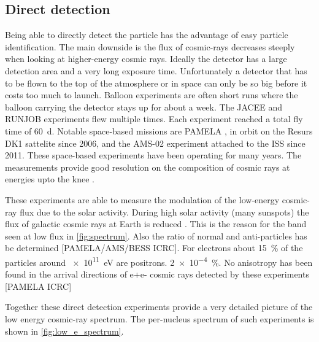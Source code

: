 \subsection{Direct detection}

Being able to directly detect the particle has the advantage of easy particle identification. The main downside is the flux of cosmic-rays decreases steeply when looking at higher-energy cosmic rays. Ideally the detector has a large detection area and a very long exposure time. Unfortunately a detector that has to be flown to the top of the atmosphere or in space can only be so big before it costs too much to launch. Balloon experiments are often short runs where the balloon carrying the detector stays up for about a week. The JACEE \cite{asakimori1998jacee} and RUNJOB \cite{hareyama2011runjob} experiments flew multiple times. Each experiment reached a total fly time of \SI{60}{\day}. Notable space-based missions are PAMELA \cite{adriani2014pamela}, in orbit on the Resurs DK1 sattelite since 2006, and the AMS-02 \cite{casaus2014ams} experiment attached to the ISS since 2011. These space-based experiments have been operating for many years. The measurements provide good resolution on the composition of cosmic rays at energies upto the knee \cite{kulikov1958knee}.

These experiments are able to measure the modulation of the low-energy cosmic-ray flux due to the solar activity. During high solar activity (many sunspots) the flux of galactic cosmic rays at Earth is reduced \cite{adriani2013modulation}. This is the reason for the band seen at low flux in \cref{fig:spectrum}. Also the ratio of normal and anti-particles has be determined [PAMELA/AMS/BESS ICRC]. For electrons about \SI{15}{\percent} of the particles around \SI{e11}{\eV} are positrons. \SI{2e-4}{\percent}. No anisotropy has been found in the arrival directions of e+e- cosmic rays detected by these experiments [PAMELA ICRC]

Together these direct detection experiments provide a very detailed picture of the low energy cosmic-ray spectrum. The per-nucleus spectrum of such experiments is shown in \cref{fig:low_e_spectrum}.


